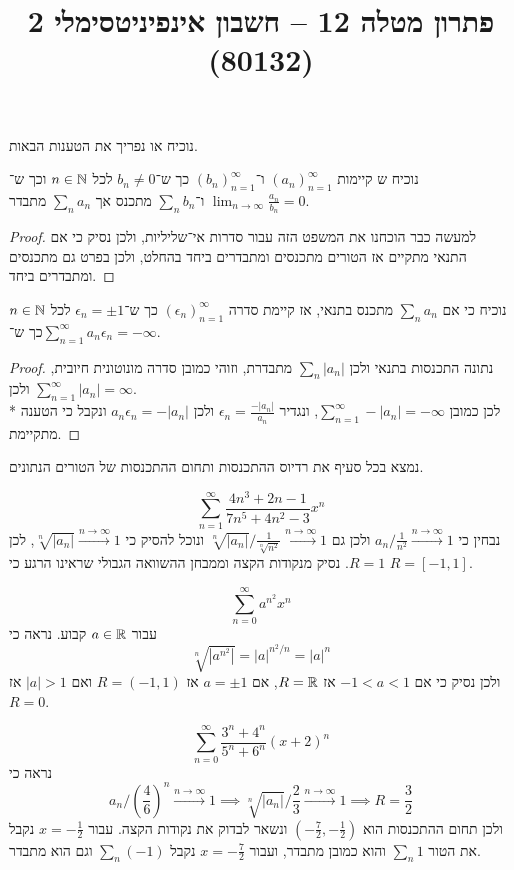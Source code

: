 
\usepackage{tikz}
\DeclareMathOperator\arcsinh{arcsinh}
\title{פתרון מטלה 12 – חשבון אינפיניטסימלי 2 (80132)}


\maketitle
\maketitleprint{}

\Question{}
נוכיח או נפריך את הטענות הבאות.

\Subquestion{}
נוכיח ש קיימות ${(a_n)}_{n = 1}^\infty$ ו־${(b_n)}_{n = 1}^\infty$ כך ש־$b_n \ne 0$ לכל $n \in \mathbb{N}$ וכך ש־$\lim_{n \to \infty} \frac{a_n}{b_n} = 0$ ו־$\sum_n b_n$ מתכנס אך $\sum_n a_n$ מתבדר.
\begin{proof}
	למעשה כבר הוכחנו את המשפט הזה עבור סדרות אי־שליליות, ולכן נסיק כי אם התנאי מתקיים אז הטורים מתכנסים ומתבדרים ביחד בהחלט, ולכן בפרט גם מתכנסים ומתבדרים ביחד.
\end{proof}

\Subquestion{}
נוכיח כי אם $\sum_n a_n$ מתכנס בתנאי, אז קיימת סדרה ${(\epsilon_n)}_{n = 1}^\infty$ כך ש־$\epsilon_n = \pm 1$ לכל $n \in \mathbb{N}$ כך ש־$\sum_{n = 1}^{\infty} a_n \epsilon_n = -\infty$.
\begin{proof}
	נתונה התכנסות בתנאי ולכן $\sum_n |a_n|$ מתבדרת, וזוהי כמובן סדרה מונוטונית חיובית, ולכן $\sum_{n = 1}^{\infty} |a_n| = \infty$. \\*
	לכן כמובן $\sum_{n = 1}^{\infty} -|a_n| = -\infty$, ונגדיר $\epsilon_n = \frac{-|a_n|}{a_n}$ ולכן $a_n \epsilon_n = -|a_n|$ ונקבל כי הטענה מתקיימת.
\end{proof}

\Question{}
נמצא בכל סעיף את רדיוס ההתכנסות ותחום ההתכנסות של הטורים הנתונים.

\Subquestion{}
\[
	\sum_{n = 1}^{\infty} \frac{4n^3 + 2n - 1}{7n^5 + 4n^2 - 3} x^n
\]
נבחין כי $a_n / \frac{1}{n^2} \xrightarrow{n \to \infty} 1$ ולכן גם $\sqrt[n]{|a_n|} / \frac{1}{\sqrt[n]{n^2}} \xrightarrow{n \to \infty} 1$ ונוכל להסיק כי $\sqrt[n]{|a_n|} \xrightarrow{n \to \infty} 1$, לכן $R = 1$.
נסיק מנקודות הקצה וממבחן ההשוואה הגבולי שראינו הרגע כי $R = [-1, 1]$.

\Subquestion{}
\[
	\sum_{n = 0}^{\infty} a^{n^2} x^n
\]
עבור $a \in \mathbb{R}$ קבוע.
נראה כי
\[
	\sqrt[n]{|a^{n^2}|}
	= {|a|}^{n^2 / n}
	= {|a|}^n
\]
ולכן נסיק כי אם $-1 < a < 1$ אז $R = \mathbb{R}$, אם $a = \pm 1$ אז $R = (-1, 1)$ ואם $|a| > 1$ אז $R = 0$.

\Subquestion{}
\[
	\sum_{n = 0}^{\infty} \frac{3^n + 4^n}{5^n + 6^n} {(x + 2)}^n
\]
נראה כי
\[
	a_n / {(\frac{4}{6})}^n \xrightarrow{n \to \infty} 1
	\implies \sqrt[n]{|a_n|} / \frac{2}{3} \xrightarrow{n \to \infty} 1
	\implies R = \frac{3}{2}
\]
ולכן תחום ההתכנסות הוא $(-\frac{7}{2}, -\frac{1}{2})$ ונשאר לבדוק את נקודות הקצה. עבור $x = -\frac{1}{2}$ נקבל את הטור $\sum_n 1$ והוא כמובן מתבדר, ועבור $x = -\frac{7}{2}$ נקבל $\sum_n (-1)$ וגם הוא מתבדר.

